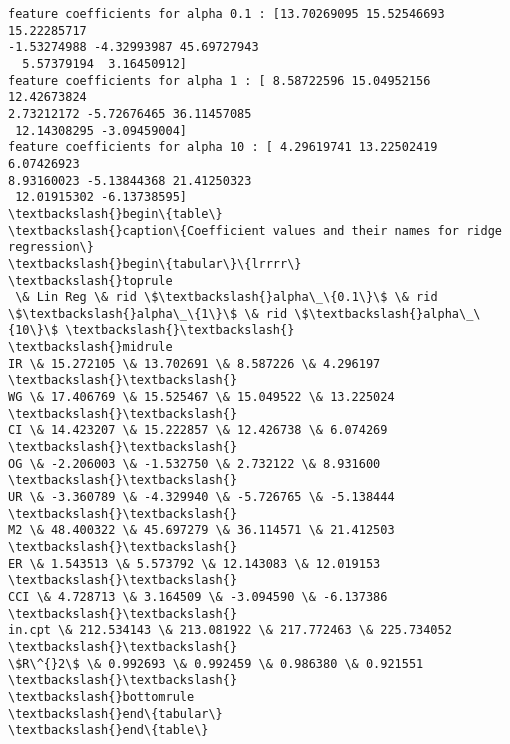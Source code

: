 \documentclass[11pt]{article}
\begin{document}
    \begin{Verbatim}[commandchars=\\\{\}]
feature coefficients for alpha 0.1 : [13.70269095 15.52546693 15.22285717
-1.53274988 -4.32993987 45.69727943
  5.57379194  3.16450912]
feature coefficients for alpha 1 : [ 8.58722596 15.04952156 12.42673824
2.73212172 -5.72676465 36.11457085
 12.14308295 -3.09459004]
feature coefficients for alpha 10 : [ 4.29619741 13.22502419  6.07426923
8.93160023 -5.13844368 21.41250323
 12.01915302 -6.13738595]
\textbackslash{}begin\{table\}
\textbackslash{}caption\{Coefficient values and their names for ridge regression\}
\textbackslash{}begin\{tabular\}\{lrrrr\}
\textbackslash{}toprule
 \& Lin Reg \& rid \$\textbackslash{}alpha\_\{0.1\}\$ \& rid \$\textbackslash{}alpha\_\{1\}\$ \& rid \$\textbackslash{}alpha\_\{10\}\$ \textbackslash{}\textbackslash{}
\textbackslash{}midrule
IR \& 15.272105 \& 13.702691 \& 8.587226 \& 4.296197 \textbackslash{}\textbackslash{}
WG \& 17.406769 \& 15.525467 \& 15.049522 \& 13.225024 \textbackslash{}\textbackslash{}
CI \& 14.423207 \& 15.222857 \& 12.426738 \& 6.074269 \textbackslash{}\textbackslash{}
OG \& -2.206003 \& -1.532750 \& 2.732122 \& 8.931600 \textbackslash{}\textbackslash{}
UR \& -3.360789 \& -4.329940 \& -5.726765 \& -5.138444 \textbackslash{}\textbackslash{}
M2 \& 48.400322 \& 45.697279 \& 36.114571 \& 21.412503 \textbackslash{}\textbackslash{}
ER \& 1.543513 \& 5.573792 \& 12.143083 \& 12.019153 \textbackslash{}\textbackslash{}
CCI \& 4.728713 \& 3.164509 \& -3.094590 \& -6.137386 \textbackslash{}\textbackslash{}
in.cpt \& 212.534143 \& 213.081922 \& 217.772463 \& 225.734052 \textbackslash{}\textbackslash{}
\$R\^{}2\$ \& 0.992693 \& 0.992459 \& 0.986380 \& 0.921551 \textbackslash{}\textbackslash{}
\textbackslash{}bottomrule
\textbackslash{}end\{tabular\}
\textbackslash{}end\{table\}

    \end{Verbatim}

    \begin{center}
    \end{center}
    { \hspace*{\fill} \\}
    
\end{document}
